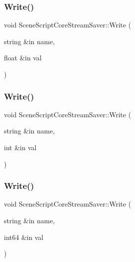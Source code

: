 \hypertarget{class_scene_script_core_stream_saver_a12a4bf603bfbbc528d6c1e90309b891a}{}\label{class_scene_script_core_stream_saver_a12a4bf603bfbbc528d6c1e90309b891a} 
\subsubsection{\texorpdfstring{Write()}{Write()}\hspace{0.1cm}{\footnotesize\ttfamily [3/6]}}
{\footnotesize\ttfamily void Scene\+Script\+Core\+Stream\+Saver\+::\+Write (\begin{DoxyParamCaption}\item[{string \&in}]{name,  }\item[{float \&in}]{val }\end{DoxyParamCaption})}

\hypertarget{class_scene_script_core_stream_saver_a0d0b6206baf370e82da58c66146a4ef5}{}\label{class_scene_script_core_stream_saver_a0d0b6206baf370e82da58c66146a4ef5} 
\subsubsection{\texorpdfstring{Write()}{Write()}\hspace{0.1cm}{\footnotesize\ttfamily [4/6]}}
{\footnotesize\ttfamily void Scene\+Script\+Core\+Stream\+Saver\+::\+Write (\begin{DoxyParamCaption}\item[{string \&in}]{name,  }\item[{int \&in}]{val }\end{DoxyParamCaption})}

\hypertarget{class_scene_script_core_stream_saver_a9d2b18c1f2989334e3d2919e7458d244}{}\label{class_scene_script_core_stream_saver_a9d2b18c1f2989334e3d2919e7458d244} 
\subsubsection{\texorpdfstring{Write()}{Write()}\hspace{0.1cm}{\footnotesize\ttfamily [5/6]}}
{\footnotesize\ttfamily void Scene\+Script\+Core\+Stream\+Saver\+::\+Write (\begin{DoxyParamCaption}\item[{string \&in}]{name,  }\item[{int64 \&in}]{val }\end{DoxyParamCaption})}


